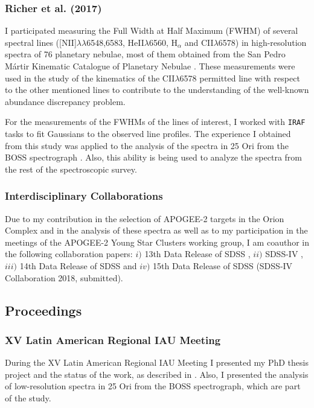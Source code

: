 \documentclass[12pt]{article}
\begin{document}
\subsubsection{Richer et al. (2017)}
\label{sec:Richer}
I participated measuring the Full Width at Half Maximum (\ac{FWHM}) of several spectral lines ([NII]$\lambda\lambda$6548,6583, HeII$\lambda$6560, H$_\alpha$ and CII$\lambda$6578) in high-resolution spectra of 76 planetary nebulae, most of them obtained from the San Pedro M\'artir Kinematic Catalogue of Planetary Nebulae \citep{Lopez2012}. These measurements were used in the \citet{Richer2017} study of the kinematics of the CII$\lambda$6578 permitted line with respect to the other mentioned lines to contribute to the understanding of the well-known abundance discrepancy problem.

For the measurements of the FWHMs of the lines of interest, I worked with \texttt{IRAF} tasks to fit Gaussians to the observed line profiles. The experience I obtained from this study was applied to the analysis of the spectra in 25 Ori from the BOSS spectrograph \citep{Suarez2017}. Also, this ability is being used to analyze the spectra from the rest of the spectroscopic survey.

\subsubsection{Interdisciplinary Collaborations}
\label{sec:interdisciplinary_collaborations}
Due to my contribution in the selection of APOGEE-2 targets in the Orion Complex and in the analysis of these spectra as well as to my participation in the meetings of the APOGEE-2 Young Star Clusters working group, I am coauthor in the following collaboration papers: $i)$ 13th Data Release of SDSS \citep{SDSS-DR13}, $ii)$ SDSS-IV \citep{Blanton2017}, $iii)$ 14th Data Release of SDSS \citep{SDSS-DR14} and $iv)$ 15th Data Release of SDSS (SDSS-IV Collaboration 2018, submitted).

\subsection{Proceedings}
\label{sec:proceedings}

\subsubsection{XV Latin American Regional IAU Meeting}
\label{sec:LARIM2016}
During the XV Latin American Regional IAU Meeting I presented my PhD thesis project and the status of the work, as described in \citet{Suarez2017b}. Also, I presented the analysis of low-resolution spectra in 25 Ori from the BOSS spectrograph, which are part of the \citet{Suarez2017} study.
\end{document}
